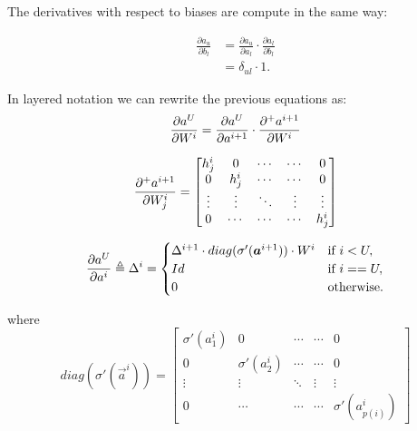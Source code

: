 The derivatives with respect to biases are compute in the same way:

\begin{align}
\frac{\partial a_u}{\partial b_{l}} &= \frac{\partial a_u}{\partial a_l} \cdot \frac{\partial a_l}{\partial b_{l}}\\
&=\delta_{ul} \cdot 1.
\end{align}



In layered notation we can rewrite the previous equations as:
\begin{equation}
 \frac{\partial a^U}{\partial W^i} = \frac{\partial a^U}{\partial a^{i+1}} \cdot \frac{\partial^{+} a^{i+1}}{\partial W^i}
\end{equation}


\begin{equation}
\frac{\partial^{+} a^{i+1}}{\partial W_j^i} =
 \begin{bmatrix}
   h_j^{i}    & 0                & \cdots      & \cdots       & 0  \\
   0               & h_j^{i}     & \cdots      & \cdots       & 0  \\
   \vdots          & \vdots           & \ddots      & \vdots       &\vdots\\
   0               & \cdots           & \cdots      & \cdots       & h^{i}_{j}
\end{bmatrix}
\end{equation}

\begin{equation}
\frac{\partial a^U}{\partial a^{i}} \triangleq \Delta^{i} = 
\begin{cases}
      \Delta^{i+1} \cdot diag(\sigma'(\boldsymbol{a}^{i+1})) \cdot W^{i}  & \text{if } i<U,\\
      Id & \text{if } i==U,\\
    0 & \text{otherwise}.
\end{cases}
\label{fnn_delta}
\end{equation}

where
\begin{equation}
diag(\sigma'(\vec{a}^{i})) =
 \begin{bmatrix}
   \sigma'(a^{i}_1)    & 0                & \cdots      & \cdots       & 0  \\
   0                     & \sigma'(a^{i}_2)     & \cdots      & \cdots       & 0  \\
   \vdots                & \vdots           & \ddots      & \vdots       &\vdots\\
   0                     & \cdots           & \cdots      & \cdots       &\sigma'(a^{i}_{p(i)})
\end{bmatrix}
\end{equation}

